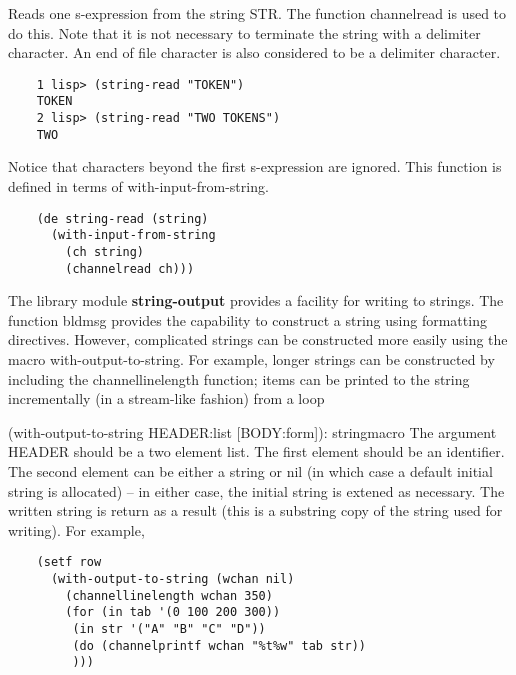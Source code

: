 {    Reads  one  s-expression  from the string STR.  The function
    channelread is used to  do  this.    Note  that  it  is  not
    necessary   to   terminate   the  string  with  a  delimiter
    character.  An end of file character is also  considered  to
    be a delimiter character.
}
\begin{verbatim}
    1 lisp> (string-read "TOKEN")
    TOKEN
    2 lisp> (string-read "TWO TOKENS")
    TWO
\end{verbatim}
    Notice  that  characters  beyond  the first s-expression are
    ignored.    This   function   is   defined   in   terms   of
    with-input-from-string.

\begin{verbatim}
    (de string-read (string)
      (with-input-from-string
        (ch string)
        (channelread ch)))
\end{verbatim}
  The  library  module {\bf string-output} provides a facility for
writing to strings.  The function bldmsg provides the capability
to construct a string using  formatting  directives.    However,
complicated  strings  can  be  constructed more easily using the
macro with-output-to-string. For example, longer strings can  be
constructed  by  including the channellinelength function; items
can be printed to the string  incrementally  (in  a  stream-like
fashion) from a loop


{(with-output-to-string HEADER:list [BODY:form]): string}{macro}
{    The argument HEADER should be a two element list.  The first
    element  should be an identifier.  The second element can be
    either a string or nil (in  which  case  a  default  initial
    string  is  allocated) -- in either case, the initial string
    is extened as necessary.
}
    The written  string  is  return  as  a  result  (this  is  a
    substring  copy  of  the  string  used  for  writing).   For
    example,
\begin{verbatim}
    (setf row
      (with-output-to-string (wchan nil)
        (channellinelength wchan 350)
        (for (in tab '(0 100 200 300))
         (in str '("A" "B" "C" "D"))
         (do (channelprintf wchan "%t%w" tab str))
         )))
\end{verbatim}
